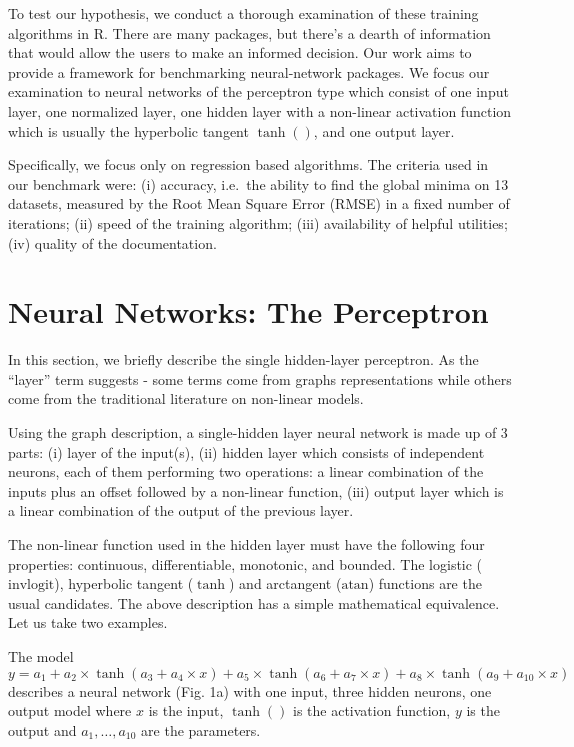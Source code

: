 To test our hypothesis, we conduct a thorough examination of these
training algorithms in \textsf{R}. There are many packages, but there's
a dearth of information that would allow the users to make an informed
decision. Our work aims to provide a framework for benchmarking
neural-network packages. We focus our examination to neural networks of
the perceptron type which consist of one input layer, one normalized
layer, one hidden layer with a non-linear activation function which is
usually the hyperbolic tangent \(\tanh()\), and one output layer.

Specifically, we focus only on regression based algorithms. The criteria
used in our benchmark were: (i) accuracy, i.e.~the ability to find the
global minima on 13 datasets, measured by the Root Mean Square Error
(RMSE) in a fixed number of iterations; (ii) speed of the training
algorithm; (iii) availability of helpful utilities; (iv) quality of the
documentation.

\hypertarget{neural-networks-the-perceptron}{%
\section{Neural Networks: The
Perceptron}\label{neural-networks-the-perceptron}}

In this section, we briefly describe the single hidden-layer perceptron.
As the ``layer'' term suggests - some terms come from graphs
representations while others come from the traditional literature on
non-linear models.

Using the graph description, a single-hidden layer neural network is
made up of 3 parts: (i) layer of the input(s), (ii) hidden layer which
consists of independent neurons, each of them performing two operations:
a linear combination of the inputs plus an offset followed by a
non-linear function, (iii) output layer which is a linear combination of
the output of the previous layer.

The non-linear function used in the hidden layer must have the following
four properties: continuous, differentiable, monotonic, and bounded. The
logistic (\(\text{invlogit}\)), hyperbolic tangent (\(\tanh\)) and
arctangent (\(\text{atan}\)) functions are the usual candidates. The
above description has a simple mathematical equivalence. Let us take two
examples.

The model
\(y = a_1 + a_2\times \tanh(a_3 + a_4\times x) + a_5\times \tanh(a_6 + a_7\times x) + a_8\times \tanh(a_9 + a_{10}\times x)\)
describes a neural network (Fig. 1a) with one input, three hidden
neurons, one output model where \(x\) is the input, \(\tanh()\) is the
activation function, \(y\) is the output and \(a_1,\dots,a_{10}\) are
the parameters.

